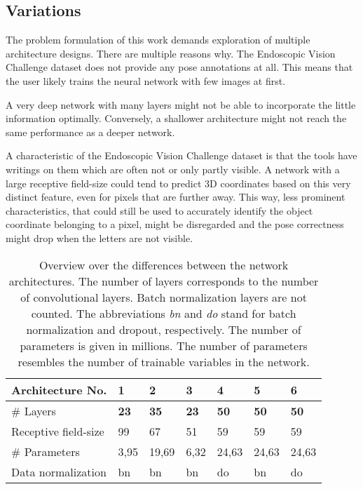 \subsection{Variations} \label{section:network_variations}

The problem formulation of this work demands exploration of multiple architecture designs. There are multiple reasons why. The Endoscopic Vision Challenge dataset does not provide any pose annotations at all. This means that the user likely trains the neural network with few images at first. 

A very deep network with many layers might not be able to incorporate the little information optimally. Conversely, a shallower architecture might not reach the same performance as a deeper network. 

A characteristic of the Endoscopic Vision Challenge dataset is that the tools have writings on them which are often not or only partly visible. A network with a large receptive field-size could tend to predict 3D coordinates based on this very distinct feature, even for pixels that are further away. This way, less prominent characteristics, that could still be used to accurately identify the object coordinate belonging to a pixel, might be disregarded and the pose correctness might drop when the letters are not visible.

\begin{table}[]
\centering
\begin{tabular}{|l||llllll|}
\hline Architecture No.        & 1          & 2          & 3          & 4          & 5          & 6        \\ \hline\hline
\rowcolor{Gray}
\# Layers               & \textbf{23}         & \textbf{35}         & \textbf{23}         & \textbf{50}         & \textbf{50}         & \textbf{50}       \\
Receptive field-size    & 99         & 67         & 51         & 59         & 59         & 59       \\
\rowcolor{Gray}
\# Parameters & 3,95  & 19,69 & 6,32  & 24,63 & 24,63   & 24,63 \\
Data normalization      & bn & bn & bn & do    & bn & do \\ \hline
\end{tabular}
\caption{Overview over the differences between the network architectures. The number of layers corresponds to the number of convolutional layers. Batch normalization layers are not counted. The abbreviations \textit{bn} and \textit{do} stand for batch normalization and dropout, respectively. The number of parameters is given in millions. The number of parameters resembles the number of trainable variables in the network.}
\label{table:network_architectures}
\end{table}


